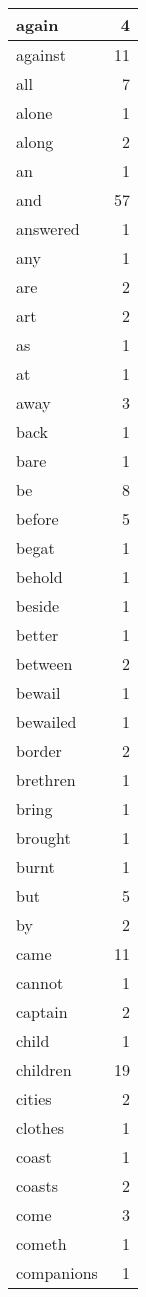 \begin{center}
\begin{longtable}{l|r}
again & 4\\ \hline 
against & 11\\ \hline 
all & 7\\ \hline 
alone & 1\\ \hline 
along & 2\\ \hline 
an & 1\\ \hline 
and & 57\\ \hline 
answered & 1\\ \hline 
any & 1\\ \hline 
are & 2\\ \hline 
art & 2\\ \hline 
as & 1\\ \hline 
at & 1\\ \hline 
away & 3\\ \hline 
back & 1\\ \hline 
bare & 1\\ \hline 
be & 8\\ \hline 
before & 5\\ \hline 
begat & 1\\ \hline 
behold & 1\\ \hline 
beside & 1\\ \hline 
better & 1\\ \hline 
between & 2\\ \hline 
bewail & 1\\ \hline 
bewailed & 1\\ \hline 
border & 2\\ \hline 
brethren & 1\\ \hline 
bring & 1\\ \hline 
brought & 1\\ \hline 
burnt & 1\\ \hline 
but & 5\\ \hline 
by & 2\\ \hline 
came & 11\\ \hline 
cannot & 1\\ \hline 
captain & 2\\ \hline 
child & 1\\ \hline 
children & 19\\ \hline 
cities & 2\\ \hline 
clothes & 1\\ \hline 
coast & 1\\ \hline 
coasts & 2\\ \hline 
come & 3\\ \hline 
cometh & 1\\ \hline 
companions & 1\\ \hline 

\end{longtable}
\end{center}
